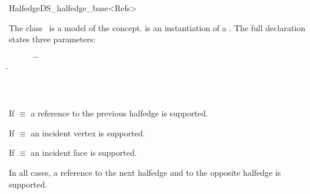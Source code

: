 
\ccRefPageBegin



\begin{ccRefClass}{HalfedgeDS_halfedge_base<Refs>}

\ccDefinition
  
The class \ccRefName\ is a model of the 
concept.  is an instantiation of a . 
The full declaration states three parameters:

\begin{tabbing}
\mbox{}~~~~~~ \=  \=\\
              \> \> \=\\
              \> \> \>\\
              \> \> \>\\
     \> 
\end{tabbing}

If  $\equiv$  a reference to the previous
halfedge is supported.

If  $\equiv$  an incident vertex is
supported.

If  $\equiv$  an incident face is
supported.

In all cases, a reference to the next halfedge and to the opposite
halfedge is supported.


\ccIsModel


\ccCreation
{}



\end{ccRefClass}
